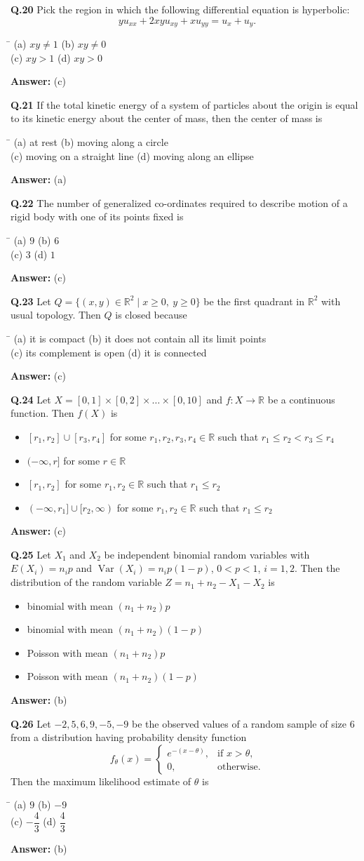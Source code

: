 \documentclass[11pt,a4paper]{article}
\newcommand{\optsfour}[4]{%
  \begin{tabbing}
    \hspace{0.48\linewidth}\=\kill
    (a) #1 \> (b) #2 \\[2pt]
    (c) #3 \> (d) #4
  \end{tabbing}%
}
\newcommand{\optslist}[4]{%
  \begin{itemize}
    \setlength{\itemsep}{2pt}\setlength{\parskip}{0pt}
    \item[(a)] #1
    \item[(b)] #2
    \item[(c)] #3
    \item[(d)] #4
  \end{itemize}%
}
\newcommand{\ans}[1]{\textbf{Answer:} #1\par\medskip}
\begin{document}
\textbf{Q.20} Pick the region in which the following differential equation is hyperbolic:
\[
  y u_{xx} + 2xy u_{xy} + x u_{yy} = u_x + u_y.
\]
\optsfour{$xy \ne 1$}{$xy \ne 0$}{$xy > 1$}{$xy > 0$}
\ans{(c)}

\textbf{Q.21} If the total kinetic energy of a system of particles about the origin is equal to its kinetic energy about the center of mass, then the center of mass is
\optsfour{at rest}{moving along a circle}{moving on a straight line}{moving along an ellipse}
\ans{(a)}

\textbf{Q.22} The number of generalized co-ordinates required to describe motion of a rigid body with one of its points fixed is
\optsfour{$9$}{$6$}{$3$}{$1$}
\ans{(c)}

\textbf{Q.23} Let $Q = \{(x,y) \in \mathbb{R}^2 \mid x \ge 0,\ y \ge 0\}$ be the first quadrant in $\mathbb{R}^2$ with usual topology. Then $Q$ is closed because
\optsfour{it is compact}{it does not contain all its limit points}{its complement is open}{it is connected}
\ans{(c)}

\textbf{Q.24} Let $X = [0,1] \times [0,2] \times \dots \times [0,10]$ and $f : X \to \mathbb{R}$ be a continuous function. Then $f(X)$ is
\optslist{$[r_1, r_2] \cup [r_3, r_4]$ for some $r_1, r_2, r_3, r_4 \in \mathbb{R}$ such that $r_1 \le r_2 < r_3 \le r_4$}{$(-\infty, r]$ for some $r \in \mathbb{R}$}{$[r_1, r_2]$ for some $r_1, r_2 \in \mathbb{R}$ such that $r_1 \le r_2$}{$(-\infty, r_1] \cup [r_2, \infty)$ for some $r_1, r_2 \in \mathbb{R}$ such that $r_1 \le r_2$}
\ans{(c)}

\textbf{Q.25} Let $X_1$ and $X_2$ be independent binomial random variables with $E(X_i) = n_i p$ and $\operatorname{Var}(X_i) = n_i p(1-p)$, $0 < p < 1$, $i = 1, 2$. Then the distribution of the random variable $Z = n_1 + n_2 - X_1 - X_2$ is
\optslist{binomial with mean $(n_1 + n_2)p$}{binomial with mean $(n_1 + n_2)(1 - p)$}{Poisson with mean $(n_1 + n_2)p$}{Poisson with mean $(n_1 + n_2)(1 - p)$}
\ans{(b)}

\textbf{Q.26} Let $-2, 5, 6, 9, -5, -9$ be the observed values of a random sample of size $6$ from a distribution having probability density function
\[
  f_\theta(x) = \begin{cases} e^{-(x - \theta)}, & \text{if } x > \theta, \\ 0, & \text{otherwise.} \end{cases}
\]
Then the maximum likelihood estimate of $\theta$ is
\optsfour{$9$}{$-9$}{$-\dfrac{4}{3}$}{$\dfrac{4}{3}$}
\ans{(b)}
\end{document}
